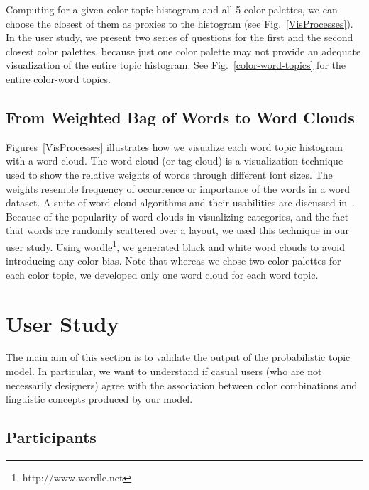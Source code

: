 \documentclass[prodmode,acmtochi]{acmsmall}
\begin{document}
Computing  for a given color topic histogram and all 5-color
palettes, we can choose the closest of them as proxies to the
histogram (see Fig.~\ref{VisProcesses}).  In the user study, we
present two series of questions for the first and the second closest
color palettes, because just one color palette may not provide an adequate visualization of the entire topic histogram. See Fig.~\ref{color-word-topics} for the entire color-word topics.

\subsection{From Weighted Bag of Words to Word Clouds}

Figures~\ref{VisProcesses} illustrates how we visualize each
word topic histogram with a word cloud.  The word cloud (or tag cloud) is a
visualization technique used to show the relative weights of words through
different font sizes.  The weights resemble frequency of occurrence or
importance of the words in a word dataset.  A suite of word cloud
algorithms and their usabilities are discussed in~\cite{seifert2008beauty}.  Because of the popularity of word clouds
in visualizing categories, and the fact that words are randomly
scattered over a layout, we used this technique in our user
study.  Using wordle\footnote{http://www.wordle.net}, we generated black
and white word clouds to avoid introducing any color bias.
Note that whereas we chose two color palettes for each color topic, we developed only one word cloud for each word topic.


\section{User Study}
\label{sec:UserStudy}

The main aim of this section is to validate the output of the
probabilistic topic model. In particular, we want to understand
if casual users (who are not necessarily designers) agree
with the association between color combinations and linguistic
concepts produced by our model.

\subsection{Participants}
\end{document}
